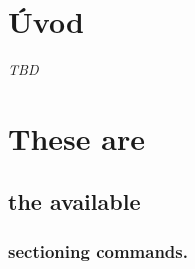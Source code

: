 \documentclass[
  digital, %
  table,   %
  lof,     %
  lot,     %
]{fithesis3}
\newcommand{\zv}{\textit}
\begin{document}
\chapter{Úvod}
\zv{TBD}










	



\chapter{These are}
\section{the available}
\subsection{sectioning commands.}
\end{document}
